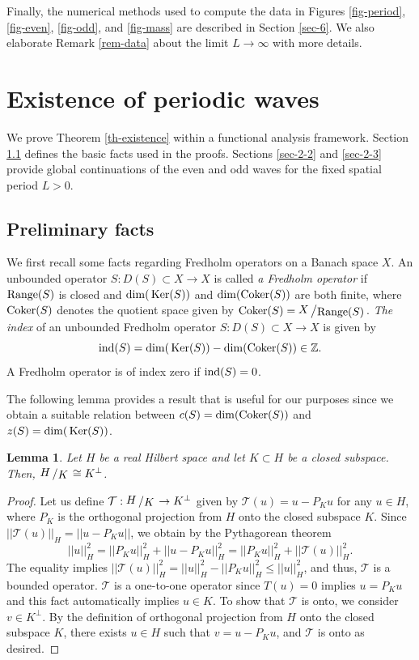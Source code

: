 \documentclass[12pt,reqno]{amsart}
\newcommand{\Ker}{{\rm \,Ker}}
\newcommand{\bigslant}[2]{{\raisebox{.1em}{$#1$}\left/\raisebox{-.1em}{$#2$}\right.}}
\numberwithin{equation}{section}
\numberwithin{figure}{section}
\newtheorem{lemma}[theorem]{Lemma}
\begin{document}
Finally, the numerical methods used to compute the data in 
Figures \ref{fig-period}, \ref{fig-even}, \ref{fig-odd}, and \ref{fig-mass} 
are described in Section \ref{sec-6}.  We also elaborate Remark \ref{rem-data} about the limit $L \to \infty$ with more details.


\section{Existence of periodic waves} 
\label{sec-2}


We prove Theorem \ref{th-existence} within a functional analysis framework. 
Section \ref{sec-2-1} defines the basic facts used in the proofs. 
Sections \ref{sec-2-2} and \ref{sec-2-3} provide global 
continuations of the even and odd waves
for the fixed spatial period $L > 0$.

\subsection{Preliminary facts}
\label{sec-2-1}

We first recall some facts regarding Fredholm operators on a Banach space $X$. 
An unbounded operator $S : D(S) \subset X\rightarrow X$ is called {\em a Fredholm operator} if ${\rm{Range}}(S)$ is closed and ${\rm{dim}}(\Ker(S))$ and ${\rm{dim}}({\rm{Coker}}(S))$ are both finite, where ${\rm{Coker}}(S)$ denotes the quotient space given by ${\rm{Coker}}(S)=\bigslant{X}{{\rm Range}(S)}$.
{\em The index} of an unbounded Fredholm operator $S:D(S)\subset X\rightarrow X$ is given by 
$$
{\rm ind}(S)={\rm{dim}}(\Ker(S))-{\rm{dim}}({\rm{Coker}}(S))\in \mathbb{Z}.
$$ 
A Fredholm operator is of index zero if ${\rm ind}(S)=0$.		

The following lemma provides a result that is useful for our purposes since we obtain a suitable relation between $c(S)={\rm{dim}}({\rm{Coker}}(S))$ and $z(S)=\dim(\Ker(S))$.
	
	\begin{lemma}
		\label{lem-Hilbert} 
		Let $H$ be a real Hilbert space and let $K\subset H$ be a closed subspace. Then, $\bigslant{H}{K}\cong K^{\bot}$.
	\end{lemma}		
		
	\begin{proof} 
		Let us define $\mathcal{T}:\bigslant{H}{K}\rightarrow K^{\bot}$ given by $\mathcal{T}(u)=u-P_Ku$ for any $u \in H$, where $P_K$ is the orthogonal projection from $H$ onto the closed subspace $K$. Since $||\mathcal{T}(u)||_H=||u-P_Ku||$, we obtain by the Pythagorean theorem  
		$$
		||u||_{H}^2 = ||P_K u||_H^2 + ||u-P_Ku||_H^2 = ||P_Ku||_H^2 + ||\mathcal{T}(u)||_H^2.
		$$
		The equality implies $||\mathcal{T}(u)||_H^2=||u||_{H}^2-||P_Ku||_H^2\leq ||u||_{H}^2$, and thus, $\mathcal{T}$ is a bounded operator. $\mathcal{T}$ is a one-to-one operator since $T(u)=0$ implies $u=P_Ku$ and this fact automatically implies $u \in K$. To show that $\mathcal{T}$ is onto, we consider $v\in K^{\bot}$. By the definition of orthogonal projection from $H$ onto the closed subspace $K$, there exists $u\in H$ such that $v=u-P_Ku$, and $\mathcal{T}$ is onto as desired.	
	\end{proof}
	
\end{document}
